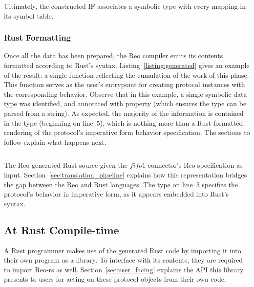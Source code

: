 Ultimately, the constructed IF associates a symbolic type with every mapping in its symbol table.

\subsubsection{Rust Formatting}
Once all the data has been prepared, the Reo compiler emits its contents formatted according to Rust's syntax. Listing~\ref{listing:generated} gives an example of the result: a single  function reflecting the cumulation of the work of this phase. This function serves as the user's entrypoint for creating protocol instances with the corresponding behavior.
Observe that in this example, a single symbolic data type  was identified, and annotated with property  (which ensures the type can be parsed from a string). As expected, the majority of the information is contained in the  type (beginning on line~5), which is nothing more than a Rust-formatted rendering of the protocol's imperative form behavior specification. The sections to follow explain what happens next.

\begin{listing}[ht]
	\centering
	\inputminted[]{rust}{generated.rs}
	\caption[TODO.]{The Reo-generated Rust source given the $fifo1$ connector's Reo specification as input. Section~\ref{sec:translation_pipeline} explains how this representation bridges the gap between the Reo and Rust languages. The  type on line~5 specifies the protocol's behavior in imperative form, as it appears embedded into Rust's syntax.}
	\label{listing:generated}
\end{listing}

\subsection{At Rust Compile-time}
A Rust programmer makes use of the generated Rust code by importing it into their own program as a library. To interface with its contents, they are required to import Reo-rs as well. Section~\ref{sec:user_facing} explains the API this library presents to users for acting on these protocol objects from their own code. 


